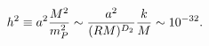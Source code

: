 \begin{equation}
    \label{hierarchy}
    h^2\equiv a^2 {M^2 \over m_P^2}
    \sim {a^2\over (R M)^{D_2} }{k\over M}
    \sim 10^{-32}.
\end{equation}

